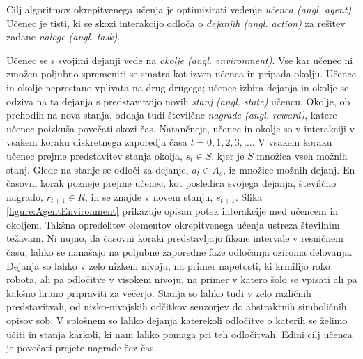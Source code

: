 \documentclass[a4paper, oneside, 12pt]{report}
\begin{document}
Cilj algoritmov okrepitvenega učenja je optimizirati vedenje {\em učenca (angl. agent)}. Učenec je tisti, ki se skozi interakcijo odloča o {\em dejanjih (angl. action)} za rešitev zadane {\em naloge (angl. task)}.

Učenec se s svojimi dejanji vede na {\em okolje (angl. environment)}. Vse kar učenec ni zmožen poljubno spremeniti se smatra kot izven učenca in pripada okolju. Učenec in okolje neprestano vplivata na drug drugega; učenec izbira dejanja in okolje se odziva na ta dejanja s predstavitvijo novih {\em stanj (angl. state)} učencu. Okolje, ob prehodih na nova stanja, oddaja tudi številčne {\em nagrade (angl. reward)}, katere učenec poizkuša povečati skozi čas. Natančneje, učenec in okolje so v interakciji v vsakem koraku diskretnega zaporedja časa $t = 0, 1, 2, 3, \dots$. V vsakem koraku učenec prejme predstavitev stanja okolja, $s_t \in S$, kjer je $S$ množica vseh možnih stanj. Glede na stanje se odloči za dejanje, $a_t \in A_s$, iz množice možnih dejanj. En časovni korak pozneje prejme učenec, kot posledica svojega dejanja, številčno nagrado, $r_{t+1} \in R$, in se znajde v novem stanju, $s_{t+1}$. Slika \ref{figure:AgentEnvironment} prikazuje opisan potek interakcije med učencem in okoljem. Takšna opredelitev elementov okrepitvenega učenja ustreza številnim težavam. Ni nujno, da časovni koraki predstavljajo fiksne intervale v resničnem času, lahko se nanašajo na poljubne zaporedne faze odločanja oziroma delovanja. Dejanja so lahko v zelo nizkem nivoju, na primer napetosti, ki krmilijo roko robota, ali pa odločitve v visokem nivoju, na primer v katero šolo se vpisati ali pa kakšno hrano pripraviti za večerjo. Stanja so lahko tudi v zelo različnih predstavitvah, od nizko-nivojskih odčitkov senzorjev do abstraktnih simboličnih opisov sob. V splošnem so lahko dejanja katerekoli odločitve o katerih se želimo učiti in stanja karkoli, ki nam lahko pomaga pri teh odločitvah. Edini cilj učenca je povečati prejete nagrade čez čas.
\end{document}
